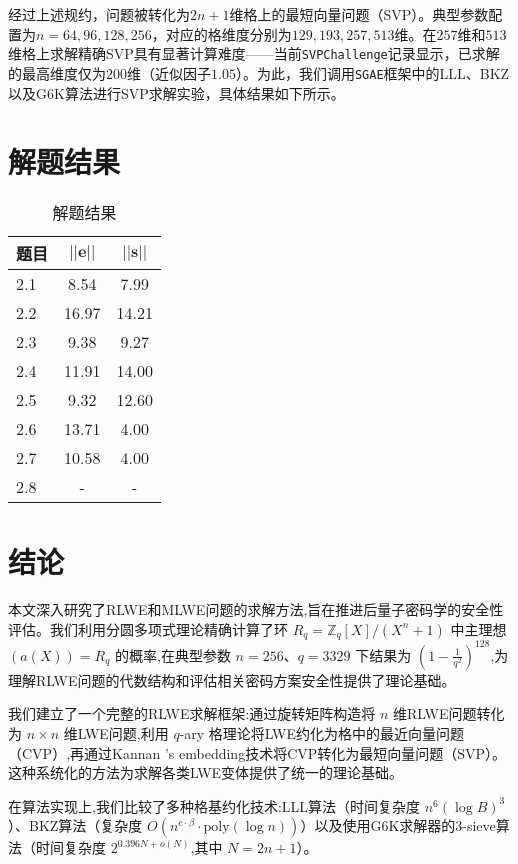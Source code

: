 \documentclass[12pt,a4paper]{article}
\numberwithin{equation}{section}
\begin{document}
经过上述规约，问题被转化为$2n+1$维格上的最短向量问题（SVP）。典型参数配置为$n=64,96,128,256$，对应的格维度分别为$129,193,257,513$维。在$257$维和$513$维格上求解精确SVP具有显著计算难度——当前\texttt{SVPChallenge}记录显示，已求解的最高维度仅为$200$维（近似因子$1.05$）。为此，我们调用\texttt{SGAE}框架中的LLL、BKZ以及G6K算法进行SVP求解实验，具体结果如下所示。


\section{解题结果}

\begin{table}[htbp]
  \centering
  \caption{解题结果}
  \label{tab:svp-performance}
  \begin{tabular}{|l|c|c|}
    \hline
    题目 & $||\mathbf{e}||$ & $||\mathbf{s}||$ \\
    \hline
    2.1 & 8.54 & 7.99 \\
    2.2 & 16.97 & 14.21 \\
    2.3 & 9.38 & 9.27 \\
    2.4 & 11.91 & 14.00 \\
    2.5 & 9.32 & 12.60 \\
    2.6 & 13.71 & 4.00 \\
    2.7 & 10.58 & 4.00 \\
    2.8 & - & - \\
    \hline
  \end{tabular}
\end{table}

\section{结论}

本文深入研究了RLWE和MLWE问题的求解方法,旨在推进后量子密码学的安全性评估。我们利用分圆多项式理论精确计算了环 $R_q = \mathbb{Z}_q[X]/(X^n + 1)$ 中主理想 $(a(X)) = R_q$ 的概率,在典型参数 $n = 256$、$q = 3329$ 下结果为 $(1-\frac{1}{q^2})^{128}$,为理解RLWE问题的代数结构和评估相关密码方案安全性提供了理论基础。

我们建立了一个完整的RLWE求解框架:通过旋转矩阵构造将 $n$ 维RLWE问题转化为 $n \times n$ 维LWE问题,利用 $q$-ary 格理论将LWE约化为格中的最近向量问题（CVP）,再通过Kannan 's embedding技术将CVP转化为最短向量问题（SVP）。这种系统化的方法为求解各类LWE变体提供了统一的理论基础。

在算法实现上,我们比较了多种格基约化技术:LLL算法（时间复杂度 $n^6 (\log B)^3$）、BKZ算法（复杂度 $O(n^{c \cdot \beta} \cdot \text{poly}(\log n))$）以及使用G6K求解器的3-sieve算法（时间复杂度 $2^{0.396N+o(N)}$,其中 $N=2n+1$）。
\end{document}

